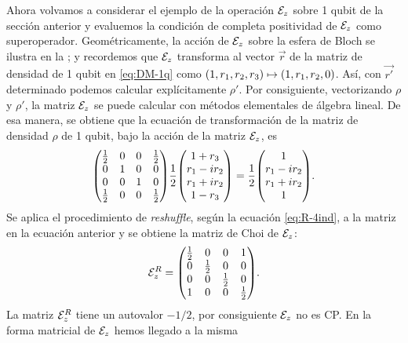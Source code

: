 Ahora volvamos a considerar el ejemplo de la operación $\mathcal{E}_z$ 
sobre 1 qubit de la sección anterior y evaluemos la condición de 
completa positividad de $\mathcal{E}_z$ como superoperador. 
Geométricamente, la acción de $\mathcal{E}_z$ sobre la 
esfera de Bloch se ilustra en la ;
y recordemos que $\mathcal{E}_z$ transforma al vector $\vec{r}$ 
de la matriz de densidad de 1 qubit en \eqref{eq:DM-1q} 
como $\qty(1,r_1,r_2,r_3)\mapsto\qty(1,r_1,r_2,0)$. Así, 
con $\vec{r'}$ determinado podemos calcular 
explícitamente $\rho'$.
Por consiguiente, vectorizando $\rho$ y $\rho'$, la matriz $\mathcal{E}_z$ 
se puede calcular con métodos elementales de álgebra lineal. 
De esa manera, se obtiene que la ecuación de transformación 
de la matriz de densidad $\rho$ de 1 qubit, bajo la
acción de la matriz $\mathcal{E}_z$, es
\begin{align}
\mqty(
\frac{1}{2} & 0 & 0 & \frac{1}{2} \\
0 & 1 & 0 & 0 \\
0 & 0 & 1 & 0 \\
\frac{1}{2} & 0 & 0 & \frac{1}{2} \\
)
\frac{1}{2}
\mqty(
1+r_3\\r_1-ir_2\\r_1+ir_2\\1-r_3
)
=
\frac{1}{2}
\mqty(
1\\r_1-ir_2\\r_1+ir_2\\1
).
\end{align}
Se aplica el procedimiento de \textit{reshuffle},
según la ecuación \eqref{eq:R-4ind}, a la matriz en la ecuación 
anterior y se obtiene la matriz de Choi de $\mathcal{E}_z$:
\begin{align}
\E_z^R=
\mqty(
\frac{1}{2} & 0 & 0 & 1 \\
0 & \frac{1}{2} & 0 & 0 \\
0 & 0 & \frac{1}{2} & 0 \\
1 & 0 & 0 & \frac{1}{2} 
).
\end{align}
La matriz $\mathcal{E}_z^R$ tiene un autovalor $-1/2$, 
por consiguiente $\mathcal{E}_z$ no es CP. 
En la forma matricial de $\mathcal{E}_z$ hemos llegado a la misma

